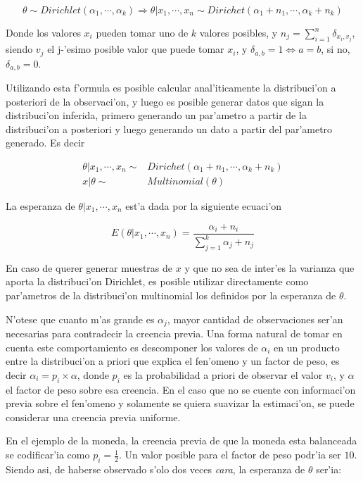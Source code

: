 $$ \theta \sim Dirichlet(\alpha_1,\cdots,\alpha_k) \Rightarrow \theta|x_1,\cdots,x_n \sim Dirichet(\alpha_1+n_1,\cdots,\alpha_k+n_k)$$

Donde los valores $x_i$ pueden tomar uno de $k$ valores posibles, y $n_j=\sum_{i=1}^n\delta_{x_i, v_j}$, siendo $v_j$ el j-'esimo posible valor 
que puede tomar $x_i$, y $\delta_{a,b} = 1 \Leftrightarrow a = b$, si no, $\delta_{a, b} = 0$. 

Utilizando esta f'ormula es posible calcular anal'iticamente la distribuci'on a posteriori de la observaci'on, y luego es posible generar
datos que sigan la distribuci'on inferida, primero generando un par'ametro a partir de la distribuci'on a posteriori y luego generando un dato
a partir del par'ametro generado. Es decir

\begin{align*}
\theta | x_1,\cdots,x_n \sim & Dirichet(\alpha_1+n_1,\cdots,\alpha_k+n_k)\\
x | \theta \sim & Multinomial(\theta)
\end{align*}

La esperanza de $\theta | x_1, \cdots, x_n$ est'a dada por la siguiente ecuaci'on

$$E(\theta|x_1,\cdots,x_n)=\frac{\alpha_i + n_i}{\sum_{j=1}^{k}{\alpha_j+n_j}}$$

En caso de querer generar muestras de $x$ y que no sea de inter'es la varianza que aporta la distribuci'on Dirichlet, es posible utilizar directamente
como par'ametros de la distribuci'on multinomial los definidos por la esperanza de $\theta$.

N'otese que cuanto m'as grande es $\alpha_j$, mayor cantidad de observaciones ser'an necesarias para contradecir la creencia previa. 
Una forma natural de tomar en cuenta este comportamiento es descomponer los valores de $\alpha_i$ en un producto entre la distribuci'on a 
priori que explica el fen'omeno y un factor de peso, es decir $\alpha_i=p_i\times\alpha$, donde $p_i$ es la probabilidad a priori de observar 
el valor $v_i$, y $\alpha$ el factor de peso sobre esa creencia. En el caso que no se cuente con informaci'on previa sobre el fen'omeno 
y solamente se quiera suavizar la estimaci'on, se puede considerar una creencia previa uniforme.

En el ejemplo de la moneda, la creencia previa de que la moneda esta balanceada se codificar'ia como $p_i=\frac{1}{2}$. 
Un valor posible para el factor de peso podr'ia ser $10$. Siendo asi, de haberse observado s'olo dos veces \emph{cara}, 
la esperanza de $\theta$ ser'ia:

